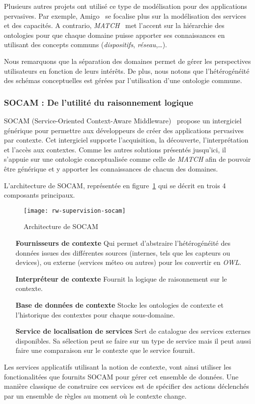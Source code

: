 Plusieurs autres projets ont utilisé ce type de modélisation pour des applications pervasives. Par exemple, Amigo~\cite{BenMokhtar:easy} se focalise plus sur la modélisation des services et des capacités. A contrario, \textit{MATCH}~\cite{Docherty:match} met l'accent sur la hiérarchie des ontologies pour que chaque domaine puisse apporter ses connaissances en utilisant des concepts communs (\textit{dispositifs}, \textit{réseau},\dots).

Nous remarquons que la séparation des domaines permet de gérer les perspectives utilisateurs en fonction de leurs intérêts. De plus, nous notons que l'hétérogénéité des schémas conceptuelles est gérées par l'utilisation d'une ontologie commune.

\subsubsection{SOCAM : De l'utilité du raisonnement logique}
SOCAM (Service-Oriented Context-Aware Middleware)~\cite{Gu:socam} propose un intergiciel générique pour permettre aux développeurs de créer des applications pervasives par contexte. Cet intergiciel supporte l'acquisition, la découverte, l'interprétation et l'accès aux contextes. Comme les autres solutions présentés jusqu'ici, il s'appuie sur une ontologie conceptualisée comme celle de \textit{MATCH} afin de pouvoir être générique et y apporter les connaissances de chacun des domaines.

L'architecture de SOCAM, représentée en figure~\ref{fig:rw:supervision:socam} qui se décrit en trois 4 composants principaux.
\begin{figure}[ht]
    \centering
    \texttt{[image: rw-supervision-socam]}
    \caption{Architecture de SOCAM}\label{fig:rw:supervision:socam}
\end{figure}
\begin{itemize}
	\item[\textbf{Fournisseurs de contexte}] Qui permet d'abstraire l'hétérogénéité des données issues des différentes sources (internes, tels que les capteurs ou devices), ou externe (services méteo ou autres) pour les convertir en \textit{OWL}.
    \item[\textbf{Interpréteur de contexte}] Fournit la logique de raisonnement sur le contexte.
    \item[\textbf{Base de données de contexte}] Stocke les ontologies de contexte et l'historique des contextes pour chaque sous-domaine.
    \item[\textbf{Service de localisation de services}] Sert de catalogue des services externes disponibles. Sa sélection peut se faire sur un type de service mais il peut aussi faire une comparaison sur le contexte que le service fournit.
\end{itemize}
Les services applicatifs utilisant la notion de contexte, vont ainsi utiliser les fonctionalitées que fournits SOCAM pour gérer cet ensemble de données. Une manière classique de construire ces services est de spécifier des actions déclenchés par un ensemble de règles au moment où le contexte change.

